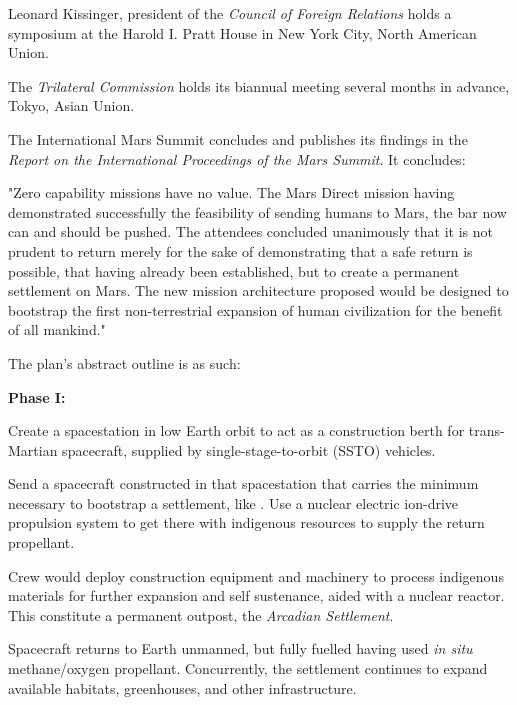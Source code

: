 Leonard Kissinger, president of the {\it Council of Foreign Relations} holds a symposium at the Harold I. Pratt House in New York City, North American Union.
\StopTimelineDate

The {\it Trilateral Commission} holds its biannual meeting several months in advance, Tokyo, Asian Union.
\StopTimelineDate

The International Mars Summit concludes and publishes its findings in the {\it Report on the International Proceedings of the Mars Summit}. It concludes:
\crlf

\startTimelineDocument
"Zero capability missions have no value. The Mars Direct mission having demonstrated successfully the feasibility of sending humans to Mars, the bar now can and should be pushed. The attendees concluded unanimously that it is not prudent to return merely for the sake of demonstrating that a safe return is possible, that having already been established, but to create a permanent settlement on Mars. The new mission architecture proposed would be designed to bootstrap the first non-terrestrial expansion of human civilization for the benefit of all mankind."
\stopTimelineDocument
\crlf

The plan's abstract outline is as such:

{\bf Phase I:} 

\startitemize[n]
\item Create a spacestation in low Earth orbit to act as a construction berth for trans-Martian spacecraft, supplied by single-stage-to-orbit (SSTO) vehicles.

\item Send a spacecraft constructed in that spacestation that carries the minimum necessary to bootstrap a settlement, like . Use a nuclear electric ion-drive propulsion system to get there with indigenous resources to supply the return propellant.

\item Crew would deploy construction equipment and machinery to process indigenous materials for further expansion and self sustenance, aided with a nuclear reactor. This constitute a permanent outpost, the {\it Arcadian Settlement}.

\item Spacecraft returns to Earth unmanned, but fully fuelled having used {\it in situ} methane/oxygen propellant. Concurrently, the settlement continues to expand available habitats, greenhouses, and other infrastructure.
\stopitemize

